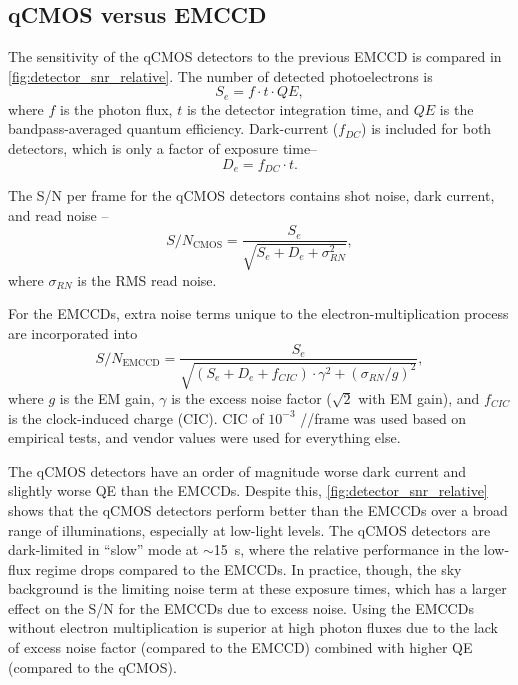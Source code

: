 \subsection{qCMOS versus EMCCD}

The sensitivity of the qCMOS detectors to the previous EMCCD is compared in \autoref{fig:detector_snr_relative}. The number of detected photoelectrons is
\begin{equation}
    S_e = f \cdot t \cdot QE,
\end{equation}
where $f$ is the photon flux, $t$ is the detector integration time, and $QE$ is the bandpass-averaged quantum efficiency. Dark-current ($f_{DC}$) is included for both detectors, which is only a factor of exposure time--
\begin{equation}
    D_e = f_{DC} \cdot t.
\end{equation}

The S/N per frame for the qCMOS detectors contains shot noise, dark current, and read noise \citep{janesick_photon_2007,stefanov_cmos_2022}--
\begin{equation}
    S/N_\mathrm{CMOS} = \frac{S_e}{\sqrt{S_e + D_e + \sigma_{RN}^2}},
\end{equation}
where $\sigma_{RN}$ is the RMS read noise.

For the EMCCDs, extra noise terms unique to the electron-multiplication process \citep{harpsoe_bayesian_2012} are incorporated into
\begin{equation}
    S/N_\mathrm{EMCCD} = \frac{S_e}{\sqrt{\left(S_e + D_e + f_{CIC}\right) \cdot \gamma^2 + \left(\sigma_{RN}/g\right)^2}},
\end{equation}
where $g$ is the EM gain, $\gamma$ is the excess noise factor ($\sqrt{2}$ with EM gain), and $f_{CIC}$ is the clock-induced charge (CIC). CIC of $10^{-3}$ \si{\electron/\pixel/frame} was used based on empirical tests, and vendor values were used for everything else.

The qCMOS detectors have an order of magnitude worse dark current and slightly worse QE than the EMCCDs. Despite this, \autoref{fig:detector_snr_relative} shows that the qCMOS detectors perform better than the EMCCDs over a broad range of illuminations, especially at low-light levels. The qCMOS detectors are dark-limited in ``slow'' mode at $\sim$\SI{15}{s}, where the relative performance in the low-flux regime drops compared to the EMCCDs. In practice, though, the sky background is the limiting noise term at these exposure times, which has a larger effect on the S/N for the EMCCDs due to excess noise. Using the EMCCDs without electron multiplication is superior at high photon fluxes due to the lack of excess noise factor (compared to the EMCCD) combined with higher QE (compared to the qCMOS).


